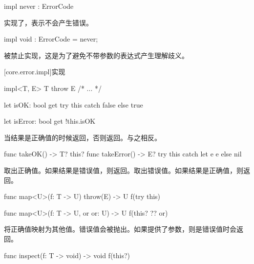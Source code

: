 \begin{itemdecl}
impl never : ErrorCode { }
\end{itemdecl}

\pnum
{}实现了，表示不会产生错误。

\begin{itemdecl}
impl void : ErrorCode = never;
\end{itemdecl}

\pnum
{}被禁止实现，这是为了避免不带参数的表达式产生理解歧义。

[core.error.impl]{实现}

\begin{itemdecl}
impl<T, E> T throw E { /* ... */ }
\end{itemdecl}

\begin{itemdecl}
let isOK: bool {
    get {
        try this catch { false } else { true }
    }
}

let isError: bool {
    get { !this.isOK }
}
\end{itemdecl}

\pnum
{}当结果是正确值的时候返回，否则返回。与之相反。

\begin{itemdecl}
func takeOK() -> T? { this? }
func takeError() -> E? { try this catch let e { e } else { nil } }
\end{itemdecl}

\pnum
{}取出正确值。如果结果是错误值，则返回。取出错误值。如果结果是正确值，则返回。

\begin{itemdecl}
func map<U>(f: T -> U) throw(E) -> U {
    f(try this)
}

func map<U>(f: T -> U, or or: U) -> U {
    f(this? ?? or)
}
\end{itemdecl}

\pnum
{}将正确值映射为其他值。错误值会被抛出。如果提供了参数，则是错误值时会返回。

\begin{itemdecl}
func inspect(f: T -> void) -> void {
    f(this?)
}
\end{itemdecl}

